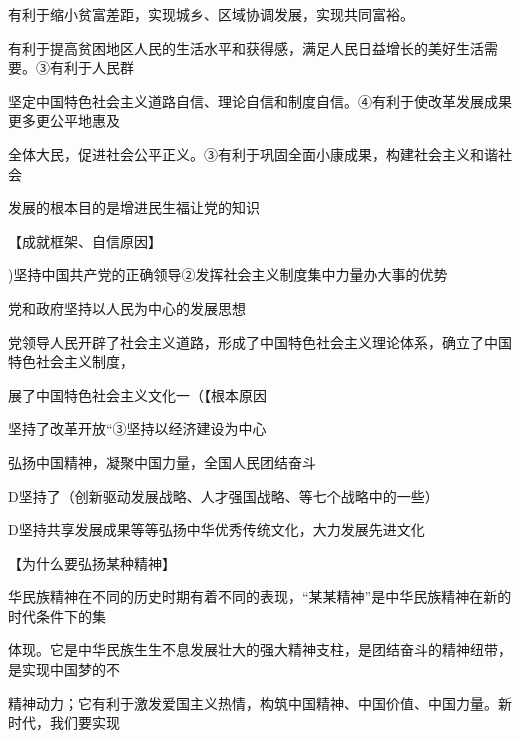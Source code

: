 \documentclass[lang=cn,11pt]{elegantbook}
\newcommand{\daofasym}[1]{{\daofasymbolfont #1}}
\newcommand{\daofasym}[1]{#1}
\begin{document}
有利于缩小贫富差距，实现城乡、区域协调发展，实现共同富裕。\par

有利于提高贫困地区人民的生活水平和获得感，满足人民日益增长的美好生活需要。\daofasym{③}有利于人民群\par

坚定中国特色社会主义道路自信、理论自信和制度自信。\daofasym{④}有利于使改革发展成果更多更公平地惠及\par

全体大民，促进社会公平正义。\daofasym{③}有利于巩固全面小康成果，构建社会主义和谐社会\par

发展的根本目的是增进民生福让党的知识\par

【成就框架、自信原因】\par

)坚持中国共产党的正确领导\daofasym{②}发挥社会主义制度集中力量办大事的优势\par

党和政府坚持以人民为中心的发展思想\par

党领导人民开辟了社会主义道路，形成了中国特色社会主义理论体系，确立了中国特色社会主义制度，\par

展了中国特色社会主义文化一（【根本原因\par

坚持了改革开放“\daofasym{③}坚持以经济建设为中心\par

弘扬中国精神，凝聚中国力量，全国人民团结奋斗\par

D坚持了（创新驱动发展战略、人才强国战略、等七个战略中的一些）\par

D坚持共享发展成果等等弘扬中华优秀传统文化，大力发展先进文化\par

【为什么要弘扬某种精神】\par

华民族精神在不同的历史时期有着不同的表现，“某某精神”是中华民族精神在新的时代条件下的集\par

体现。它是中华民族生生不息发展壮大的强大精神支柱，是团结奋斗的精神纽带，是实现中国梦的不\par

精神动力；它有利于激发爱国主义热情，构筑中国精神、中国价值、中国力量。新时代，我们要实现\par
\end{document}
